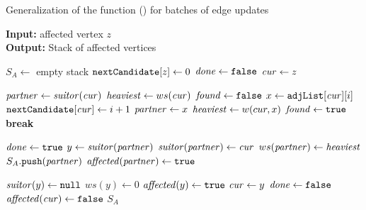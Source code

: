 \begin{algorithm}[t]
\footnotesize
\caption{\footnotesize Generalization of the \findaff function () for
batches of edge updates}
\label{algo:dyn-suitor-find-aff-b}
\textbf{Input:} affected vertex $z$\\
\textbf{Output:} Stack of affected vertices

\begin{algorithmic}[1]
\State$S_A \gets$ empty stack
\State$\texttt{nextCandidate}[z] \gets 0$
\State$\mathit{done} \gets \texttt{false}$
\State$\mathit{cur} \gets z$

\Repeat
    \State$\mathit{partner} \gets \mathit{suitor}(\mathit{cur})$
    \State$\mathit{heaviest} \gets ws(\mathit{cur})$
    \State$\mathit{found} \gets \texttt{false}$
    \label{line:find-aff-b-for-neigh}
    \State$x \gets \texttt{adjList}[\mathit{cur}][i]$
    \State$\texttt{nextCandidate}[\mathit{cur}] \gets i + 1$
            \State$\mathit{partner} \gets x$
            \State$\mathit{heaviest} \gets w(cur, x)$
            \State$\mathit{found} \gets \texttt{true}$
            \State\textbf{break}\label{line:dyn-suitor-find-aff-b-break}
        \EndIf
    \EndFor

    \State$\mathit{done} \gets \texttt{true}$
        \State$y \gets \mathit{suitor}(\mathit{partner})$
        \State$\mathit{suitor}(\mathit{partner}) \gets \mathit{cur}$
        \State$ws(\mathit{partner}) \gets \mathit{heaviest}$
        \State$S_A.\texttt{push}(\mathit{partner})$
        \State$\mathit{affected}(\mathit{partner}) \gets \texttt{true}$

            \State$\mathit{suitor}(y) \gets \texttt{null}$
            \State$ws(y) \gets 0$
            \State$\mathit{affected}(y) \gets \texttt{true}$
            \State$\mathit{cur} \gets y$
            \State$\mathit{done} \gets \texttt{false}$
        \EndIf
    \Else
    \State$\mathit{affected}(\mathit{cur}) \gets \texttt{false}$
    \EndIf
{}
\State\Return$S_A$
\EndFunction
\end{algorithmic}
\end{algorithm}
